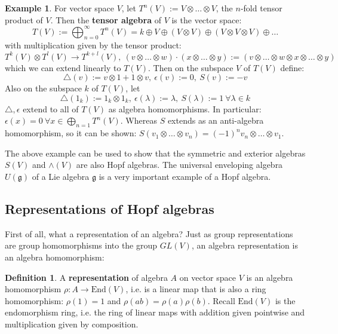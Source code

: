 \documentclass[11pt]{article}
\newcommand{\nt}{\noindent}
\newcommand{\rt}{\xrightarrow{}}
\newcommand{\cd}{\cdot}
\newcommand{\End}{\text{End}}
\newcommand{\define}[1]{\textbf{#1}}
\theoremstyle{definition}
\newtheorem{definition}[lemma]{Definition}
\newtheorem{example}[lemma]{Example}
\begin{document}
\begin{example} For vector space $V$, let $T^n(V):=V\otimes \dots \otimes V$, the $n$-fold tensor product of $V$. Then the \define{tensor algebra} of $V$ is the vector space: 
  $$T(V):=\bigoplus_{n=0}^\infty T^n(V)=k\oplus V\oplus (V\otimes V)\oplus (V\otimes V\otimes V)\oplus \dots$$
  with multiplication given by the tensor product:
  $$T^k(V)\otimes T^l(V)\rt T^{k+l}(V),\ (v\otimes \dots \otimes w)\cd (x\otimes \dots \otimes y):=(v\otimes \dots \otimes w\otimes x \otimes \dots \otimes y)$$ 
  which we can extend linearly to $T(V)$. Then on the subspace $V$ of $T(V)$ define: 
  $$\triangle(v):=v\otimes 1+1\otimes v,\ \epsilon(v):=0,\ S(v):=-v$$
  Also on the subspace $k$ of $T(V)$, let 
  $$\triangle(1_k):=1_k\otimes 1_k,\ \epsilon(\lambda):=\lambda,\ S(\lambda):=1\ \forall\lambda\in k$$ 
  $\triangle,\epsilon$ extend to all of $T(V)$ as algebra homomorphisms. In particular: $\epsilon(x)=0\ \forall x\in\bigoplus_{n=1}T^n(V)$. Whereas $S$ extends as an anti-algebra homomorphism, so it can be shown: $S(v_1\otimes \dots \otimes v_n)=(-1)^n v_n\otimes \dots \otimes v_1$. %
  \end{example}

\nt The above example can be used to show that the symmetric and exterior algebras $S(V)$ and $\wedge (V)$ are also Hopf algebras. The universal enveloping algebra $U(\mathfrak{g})$ of a Lie algebra $\mathfrak{g}$ is a very important example of a Hopf algebra.

\subsection{Representations of Hopf algebras}
First of all, what a representation of an algebra? Just as group representations are group homomorphisms into the group $GL(V)$, an algebra representation is an algebra homomorphism:

\begin{definition} A \define{representation} of algebra $A$ on vector space $V$ is an algebra homomorphism $\rho:A\rt \End(V)$, i.e. is a linear map that is also a ring homomorphism: $\rho(1)=1$ and $\rho(ab)=\rho(a)\rho(b)$. Recall $\End(V)$ is the endomorphism ring, i.e. the ring of linear maps with addition given pointwise and multiplication given by composition.  
\end{definition}
\end{document}
